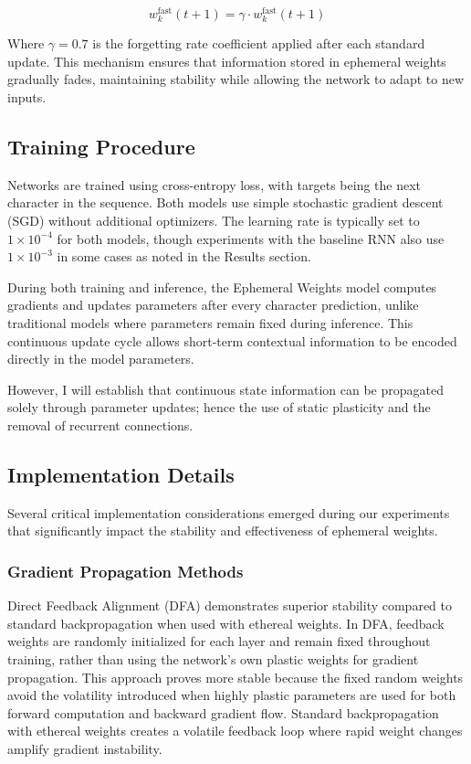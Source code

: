 \documentclass{article} %
\begin{document}
\begin{equation}
w_k^{\text{fast}}(t+1) = \gamma \cdot w_k^{\text{fast}}(t+1)
\end{equation}

Where $\gamma = 0.7$ is the forgetting rate coefficient applied after each standard update. This mechanism ensures that information stored in ephemeral weights gradually fades, maintaining stability while allowing the network to adapt to new inputs.

\subsection{Training Procedure}

Networks are trained using cross-entropy loss, with targets being the next character in the sequence. Both models use simple stochastic gradient descent (SGD) without additional optimizers. The learning rate is typically set to $1 \times 10^{-4}$ for both models, though experiments with the baseline RNN also use $1 \times 10^{-3}$ in some cases as noted in the Results section.

During both training and inference, the Ephemeral Weights model computes gradients and updates parameters after every character prediction, unlike traditional models where parameters remain fixed during inference. This continuous update cycle allows short-term contextual information to be encoded directly in the model parameters.

However, I will establish that continuous state information can be propagated solely through parameter updates; hence the use of static plasticity and the removal of recurrent connections.

\subsection{Implementation Details}

Several critical implementation considerations emerged during our experiments that significantly impact the stability and effectiveness of ephemeral weights.

\subsubsection{Gradient Propagation Methods}

Direct Feedback Alignment (DFA) demonstrates superior stability compared to standard backpropagation when used with ethereal weights. In DFA, feedback weights are randomly initialized for each layer and remain fixed throughout training, rather than using the network's own plastic weights for gradient propagation. This approach proves more stable because the fixed random weights avoid the volatility introduced when highly plastic parameters are used for both forward computation and backward gradient flow. Standard backpropagation with ethereal weights creates a volatile feedback loop where rapid weight changes amplify gradient instability.
\end{document}
